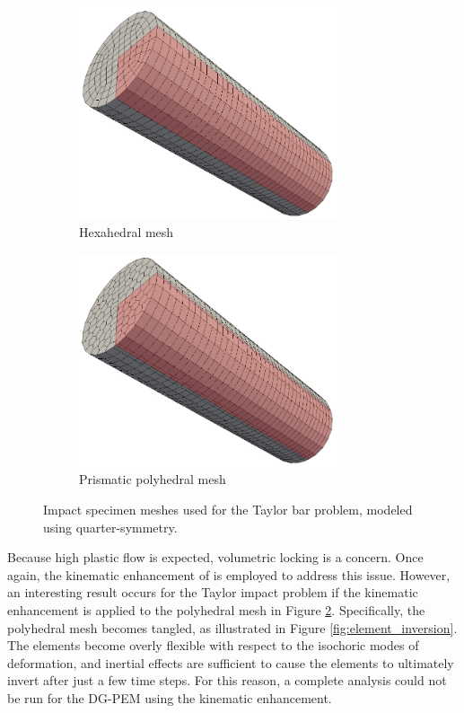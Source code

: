 \begin{figure}[!h]
  \centering
    \begin{subfigure}[b]{0.49\linewidth}
            \centering
            \includegraphics[width=3.0in]{figures/taylor_bar_hex_mesh.pdf}
    			\caption{Hexahedral mesh \label{fig:taylor_bar_hex_mesh}}
    \end{subfigure}
	\begin{subfigure}[b]{0.49\linewidth}
            \centering
            \includegraphics[width=3.0in]{figures/taylor_bar_poly_mesh.pdf}
    			\caption{Prismatic polyhedral mesh \label{fig:taylor_bar_poly_mesh}}
    \end{subfigure} \caption{Impact specimen meshes used for the Taylor bar problem, modeled using quarter-symmetry.}
  \label{fig:taylor_bar_meshes}
\end{figure}

Because high plastic flow is expected, volumetric locking is a concern. Once again, the kinematic enhancement of \cite{Rashid:06} is employed to address this issue. However, an interesting result occurs for the Taylor impact problem if the kinematic enhancement is applied to the polyhedral mesh in Figure \ref{fig:taylor_bar_poly_mesh}. Specifically, the polyhedral mesh becomes tangled, as illustrated in Figure \ref{fig:element_inversion}. The elements become overly flexible with respect to the isochoric modes of deformation, and inertial effects are sufficient to cause the elements to ultimately invert after just a few time steps. For this reason, a complete analysis could not be run for the DG-PEM using the kinematic enhancement.

